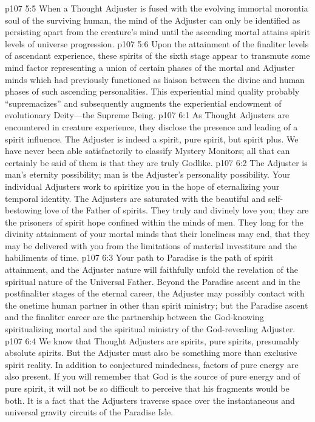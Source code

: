 \vs p107 5:5 When a Thought Adjuster is fused with the evolving immortal morontia soul of the surviving human, the mind of the Adjuster can only be identified as persisting apart from the creature’s mind until the ascending mortal attains spirit levels of universe progression.
\vs p107 5:6 Upon the attainment of the finaliter levels of ascendant experience, these spirits of the sixth stage appear to transmute some mind factor representing a union of certain phases of the mortal and Adjuster minds which had previously functioned as liaison between the divine and human phases of such ascending personalities. This experiential mind quality probably “supremacizes” and subsequently augments the experiential endowment of evolutionary Deity---the Supreme Being.
\vs p107 6:1 As Thought Adjusters are encountered in creature experience, they disclose the presence and leading of a spirit influence. The Adjuster is indeed a spirit, pure spirit, but spirit plus. We have never been able satisfactorily to classify Mystery Monitors; all that can certainly be said of them is that they are truly Godlike.
\vs p107 6:2 The Adjuster is man’s eternity possibility; man is the Adjuster’s personality possibility. Your individual Adjusters work to spiritize you in the hope of eternalizing your temporal identity. The Adjusters are saturated with the beautiful and self\hyp{}bestowing love of the Father of spirits. They truly and divinely love you; they are the prisoners of spirit hope confined within the minds of men. They long for the divinity attainment of your mortal minds that their loneliness may end, that they may be delivered with you from the limitations of material investiture and the habiliments of time.
\vs p107 6:3 Your path to Paradise is the path of spirit attainment, and the Adjuster nature will faithfully unfold the revelation of the spiritual nature of the Universal Father. Beyond the Paradise ascent and in the postfinaliter stages of the eternal career, the Adjuster may possibly contact with the onetime human partner in other than spirit ministry; but the Paradise ascent and the finaliter career are the partnership between the God\hyp{}knowing spiritualizing mortal and the spiritual ministry of the God\hyp{}revealing Adjuster.
\pc \vs p107 6:4 We know that Thought Adjusters are spirits, pure spirits, presumably absolute spirits. But the Adjuster must also be something more than exclusive spirit reality. In addition to conjectured mindedness, factors of pure energy are also present. If you will remember that God is the source of pure energy and of pure spirit, it will not be so difficult to perceive that his fragments would be both. It is a fact that the Adjusters traverse space over the instantaneous and universal gravity circuits of the Paradise Isle.
